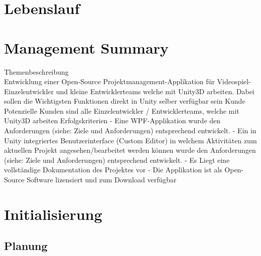 \section{Lebenslauf}
\newpage

\section{Management Summary}
Themenbeschreibung\\
Entwicklung einer Open-Source Projektmanagement-Applikation für Videospiel-Einzelentwickler und
kleine Entwicklerteams welche mit Unity3D arbeiten. Dabei sollen die Wichtigsten Funktionen direkt
in Unity selber verfügbar sein
Kunde
Potenzielle Kunden sind alle Einzelentwickler / Entwicklerteams, welche mit Unity3D arbeiten
Erfolgskriterien
- Eine WPF-Applikation wurde den Anforderungen (siehe: Ziele und Anforderungen)
entsprechend entwickelt.
- Ein in Unity integriertes Benutzerinterface (Custom Editor) in welchem Aktivitäten zum
aktuellen Projekt angesehen/bearbeitet werden können wurde den Anforderungen (siehe:
Ziele und Anforderungen) entsprechend entwickelt.
- Es Liegt eine vollständige Dokumentation des Projektes vor
- Die Applikation ist als Open-Source Software lizensiert und zum Download verfügbar

\newpage

\section{Initialisierung}
\newpage


\subsection{Planung}


